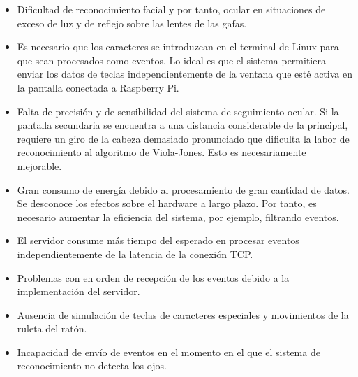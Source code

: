 \begin{itemize}
    \item Dificultad de reconocimiento facial y por tanto, ocular en situaciones de exceso de luz y de reflejo sobre las lentes de las gafas.
    \item Es necesario que los caracteres se introduzcan en el terminal de Linux para que sean procesados como eventos. Lo ideal es que el sistema permitiera enviar los datos de teclas independientemente de la ventana que esté activa en la pantalla conectada a Raspberry Pi.
    \item Falta de precisión y de sensibilidad del sistema de seguimiento ocular. Si la pantalla secundaria se encuentra a una distancia considerable de la principal, requiere un giro de la cabeza demasiado pronunciado que dificulta la labor de reconocimiento al algoritmo de Viola-Jones. Esto es necesariamente mejorable.
    \item Gran consumo de energía debido al procesamiento de gran cantidad de datos. Se desconoce los efectos sobre el hardware a largo plazo. Por tanto, es necesario aumentar la eficiencia del sistema, por ejemplo, filtrando eventos.
    \item El servidor consume más tiempo del esperado en procesar eventos independientemente de la latencia de la conexión TCP.
    \item Problemas con en orden de recepción de los eventos debido a la implementación del servidor.
    \item Ausencia de simulación de teclas de caracteres especiales y movimientos de la ruleta del ratón.
    \item Incapacidad de envío de eventos en el momento en el que el sistema de reconocimiento no detecta los ojos.
\end{itemize}
















\newpage

